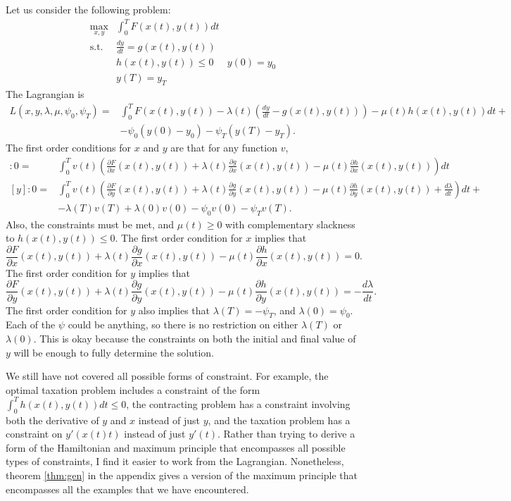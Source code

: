 Let us consider the following problem:
\begin{align*}
  \max_{x,y} & \int_0^T F(x(t),y(t)) dt \\
  \text{s.t.} & \frac{dy}{dt} = g(x(t),y(t)) \\
  & h(x(t),y(t)) \leq 0 
  & y(0) = y_0 \\
  & y(T) = y_T 
\end{align*}
The Lagrangian is  
\begin{align*}
  L(x,y,\lambda, \mu, \psi_0,\psi_T) = & \int_0^T F(x(t),y(t)) -
\lambda(t) (\frac{dy}{dt} - g(x(t),y(t)) ) - \mu(t) h(x(t),y(t)) dt +
\\
& - \psi_0(y(0) - y_0) - \psi_T(y(T) - y_T). 
\end{align*}
The first order conditions for $x$ and $y$ are that for any function
$v$, 
\begin{align*}
  [x]: 0 = & \int_0^T v(t) \left(\frac{\partial F}{\partial
      x}(x(t),y(t)) + \lambda(t) \frac{\partial g}{\partial
      x}(x(t),y(t)) - \mu(t) \frac{\partial h}{\partial x}(x(t),y(t))
  \right) dt \\
  [y]: 0 = & \int_0^T v(t) \left(\frac{\partial F}{\partial
      y}(x(t),y(t)) + \lambda(t) \frac{\partial g}{\partial y}(x(t),y(t))
    - \mu(t) \frac{\partial h}{\partial y}(x(t),y(t)) +
  \frac{d\lambda}{dt} \right)dt + 
  \\ 
   & - \lambda(T)v(T) + \lambda(0)v(0)  - \psi_0v(0) - \psi_T v(T).
\end{align*}
Also, the constraints must be met, and $\mu(t) \geq 0$ with
complementary slackness to $h(x(t),y(t)) \leq 0$. The first order
condition for $x$ implies that
\[ \frac{\partial F}{\partial
  x}(x(t),y(t)) + \lambda(t) \frac{\partial g}{\partial
  x}(x(t),y(t)) - \mu(t) \frac{\partial h}{\partial x}(x(t),y(t))
= 0. \]
The first order condition for $y$ implies that 
\[ \frac{\partial F}{\partial
  y}(x(t),y(t)) + \lambda(t) \frac{\partial g}{\partial y}(x(t),y(t))
- \mu(t) \frac{\partial h}{\partial y}(x(t),y(t)) =
-\frac{d\lambda}{dt}. \]
The first order condition for $y$ also implies that $\lambda(T) =
-\psi_T$, and $\lambda(0) = \psi_0$. Each of the $\psi$ could be
anything, so there is no restriction on either $\lambda(T)$ or
$\lambda(0)$. This is okay because the constraints on both the initial
and final value of $y$ will be enough to fully determine the
solution. 

We still have not covered all possible forms of constraint. For
example, the optimal taxation problem includes a constraint of the
form $\int_0^T h(x(t),y(t)) dt \leq 0$, the contracting problem has a
constraint involving both the derivative of $y$ and $x$ instead of
just $y$, and the taxation problem has a constraint on $y'(x(t)t)$
instead of just $y'(t)$.  Rather than trying to derive a form of the
Hamiltonian and maximum principle that encompasses all possible types
of constraints, I find it easier to work from the
Lagrangian. Nonetheless, theorem \ref{thm:gen} in the appendix gives a
version of the maximum principle that encompasses all the examples
that we have encountered.


